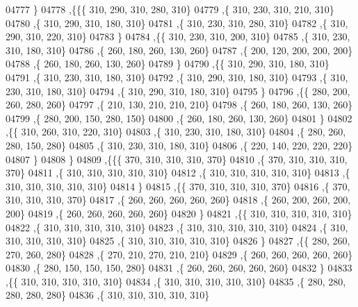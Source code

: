 \begin{DoxyCode}
04777    \}
04778   ,\{\{\{   310,   290,   310,   280,   310\}
04779     ,\{   310,   230,   310,   210,   310\}
04780     ,\{   310,   290,   310,   180,   310\}
04781     ,\{   310,   230,   310,   280,   310\}
04782     ,\{   310,   290,   310,   220,   310\}
04783     \}
04784    ,\{\{   310,   230,   310,   200,   310\}
04785     ,\{   310,   230,   310,   180,   310\}
04786     ,\{   260,   180,   260,   130,   260\}
04787     ,\{   200,   120,   200,   200,   200\}
04788     ,\{   260,   180,   260,   130,   260\}
04789     \}
04790    ,\{\{   310,   290,   310,   180,   310\}
04791     ,\{   310,   230,   310,   180,   310\}
04792     ,\{   310,   290,   310,   180,   310\}
04793     ,\{   310,   230,   310,   180,   310\}
04794     ,\{   310,   290,   310,   180,   310\}
04795     \}
04796    ,\{\{   280,   200,   260,   280,   260\}
04797     ,\{   210,   130,   210,   210,   210\}
04798     ,\{   260,   180,   260,   130,   260\}
04799     ,\{   280,   200,   150,   280,   150\}
04800     ,\{   260,   180,   260,   130,   260\}
04801     \}
04802    ,\{\{   310,   260,   310,   220,   310\}
04803     ,\{   310,   230,   310,   180,   310\}
04804     ,\{   280,   260,   280,   150,   280\}
04805     ,\{   310,   230,   310,   180,   310\}
04806     ,\{   220,   140,   220,   220,   220\}
04807     \}
04808    \}
04809   ,\{\{\{   370,   310,   310,   310,   370\}
04810     ,\{   370,   310,   310,   310,   370\}
04811     ,\{   310,   310,   310,   310,   310\}
04812     ,\{   310,   310,   310,   310,   310\}
04813     ,\{   310,   310,   310,   310,   310\}
04814     \}
04815    ,\{\{   370,   310,   310,   310,   370\}
04816     ,\{   370,   310,   310,   310,   370\}
04817     ,\{   260,   260,   260,   260,   260\}
04818     ,\{   260,   200,   260,   200,   200\}
04819     ,\{   260,   260,   260,   260,   260\}
04820     \}
04821    ,\{\{   310,   310,   310,   310,   310\}
04822     ,\{   310,   310,   310,   310,   310\}
04823     ,\{   310,   310,   310,   310,   310\}
04824     ,\{   310,   310,   310,   310,   310\}
04825     ,\{   310,   310,   310,   310,   310\}
04826     \}
04827    ,\{\{   280,   260,   270,   260,   280\}
04828     ,\{   270,   210,   270,   210,   210\}
04829     ,\{   260,   260,   260,   260,   260\}
04830     ,\{   280,   150,   150,   150,   280\}
04831     ,\{   260,   260,   260,   260,   260\}
04832     \}
04833    ,\{\{   310,   310,   310,   310,   310\}
04834     ,\{   310,   310,   310,   310,   310\}
04835     ,\{   280,   280,   280,   280,   280\}
04836     ,\{   310,   310,   310,   310,   310\}

\end{DoxyCode}
